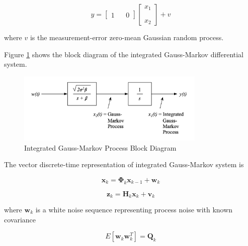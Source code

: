 \documentclass[12pt]{article}
\begin{document}
\begin{equation}
    y = 
    \begin{bmatrix}
    1 & & 0
    \end{bmatrix}
    \begin{bmatrix}
    x_1 \\
    \phantom{m} \\
    x_2
    \end{bmatrix}
    +
    v
    \label{eq:IGM-observation}
\end{equation}

where $v$ is the measurement-error zero-mean Gaussian random process.

Figure \ref{fig:IGM-block-diagram} shows the block diagram of the integrated Gauss-Markov
differential system.

\begin{figure}[ht]
    \centering
    \includegraphics[width=0.8\textwidth]{IGM-Block-Diagram.png}
    \caption{Integrated Gauss-Markov Process Block Diagram}
    \label{fig:IGM-block-diagram}
\end{figure}

The vector discrete-time representation of integrated Gauss-Markov system is

\begin{equation}
    \mathbf{x}_k = \mathbf{\Phi}_k \mathbf{x}_{k-1} + \mathbf{w}_k
    \label{eq:IGM-discrete-state-equation}
\end{equation}

\begin{equation}
    \mathbf{z}_k = \mathbf{H}_k \mathbf{x}_{k} + \mathbf{v}_k
    \label{eq:IGM-discrete-measurement-equation}
\end{equation}

where $\mathbf{w}_k$ is a white noise sequence representing process noise with known
covariance

\begin{equation}
    E[\mathbf{w}_k \mathbf{w}_k^T] = \mathbf{Q}_k
    \label{eq:IGM-discrete-process-covariance}
\end{equation}
\end{document}
